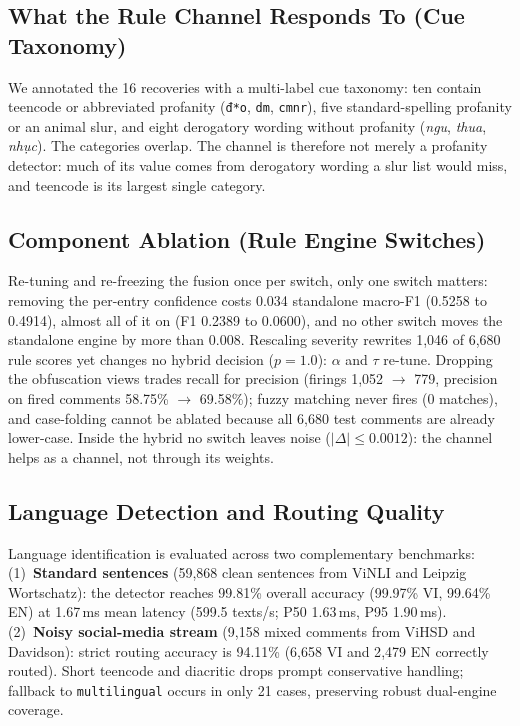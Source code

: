 \subsection{What the Rule Channel Responds To (Cue Taxonomy)}
\label{sec:cue_taxonomy}

We annotated the 16 \hate{} recoveries with a multi-label cue taxonomy: ten
contain teencode or abbreviated profanity (\texttt{đ*o}, \texttt{dm},
\texttt{cmnr}), five standard-spelling profanity or an animal slur, and eight
derogatory wording without profanity (\emph{ngu}, \emph{thua}, \emph{nhục}).
The categories overlap.  The channel is therefore not merely a profanity
detector: much of its value comes from derogatory wording a slur list would
miss, and teencode is its largest single category.

\subsection{Component Ablation (Rule Engine Switches)}
\label{sec:ablation}

Re-tuning and re-freezing the fusion once per switch, only one switch matters:
removing the per-entry confidence costs 0.034 standalone macro-F1 (0.5258 to
0.4914), almost all of it on \off{} (F1 0.2389 to 0.0600), and no other
switch moves the standalone engine by more than 0.008.  Rescaling severity
rewrites 1{,}046 of 6{,}680 rule scores yet changes no hybrid decision
($p=1.0$): $\alpha$ and $\tau$ re-tune.  Dropping the obfuscation views trades
recall for precision (firings 1{,}052 $\to$ 779, precision on fired comments
58.75\% $\to$ 69.58\%); fuzzy matching never fires (0 matches), and case-folding
cannot be ablated because all 6{,}680 test comments are already lower-case.
Inside the hybrid no switch leaves noise ($|\Delta|\le0.0012$): the channel
helps as a channel, not through its weights.

\subsection{Language Detection and Routing Quality}
\label{sec:lang_quality}

Language identification is evaluated across two complementary benchmarks:
(1)~\textbf{Standard sentences} (59{,}868 clean sentences from ViNLI and Leipzig Wortschatz): the detector reaches 99.81\% overall accuracy (99.97\% VI, 99.64\% EN) at 1.67\,ms mean latency (599.5 texts/s; P50 1.63\,ms, P95 1.90\,ms).
(2)~\textbf{Noisy social-media stream} (9{,}158 mixed comments from ViHSD and Davidson): strict routing accuracy is 94.11\% (6{,}658 VI and 2{,}479 EN correctly routed). Short teencode and diacritic drops prompt conservative handling; fallback to \texttt{multilingual} occurs in only 21 cases, preserving robust dual-engine coverage.

